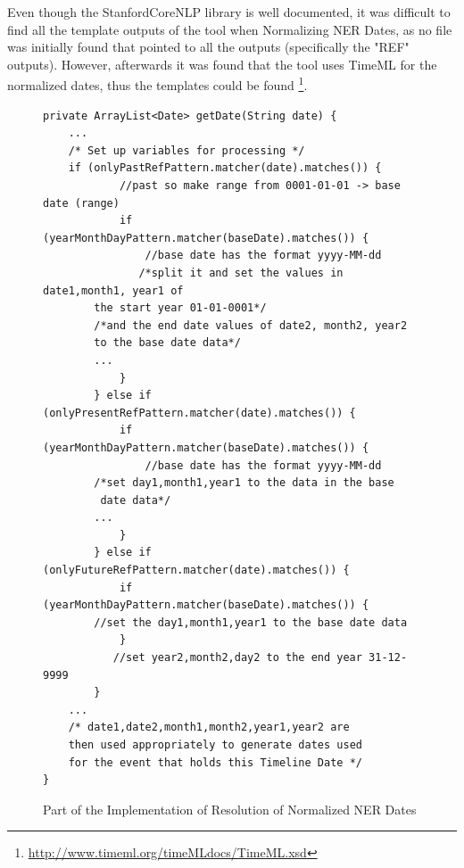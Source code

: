\par Even though the StanfordCoreNLP library is well documented, it was difficult to find all the template outputs of the tool when Normalizing NER Dates, as no file was initially found that pointed to all the outputs (specifically the "REF" outputs). However, afterwards it was found that the tool uses TimeML for the normalized dates, thus the templates could be found \footnote{\url{http://www.timeml.org/timeMLdocs/TimeML.xsd}}. 
\begin{figure}[H]
\begin{lstlisting}
private ArrayList<Date> getDate(String date) {
	...
	/* Set up variables for processing */
	if (onlyPastRefPattern.matcher(date).matches()) {
            //past so make range from 0001-01-01 -> base date (range)
            if (yearMonthDayPattern.matcher(baseDate).matches()) {
                //base date has the format yyyy-MM-dd
               /*split it and set the values in date1,month1, year1 of 
		the start year 01-01-0001*/
		/*and the end date values of date2, month2, year2 
		to the base date data*/
		...
            }
        } else if (onlyPresentRefPattern.matcher(date).matches()) {
            if (yearMonthDayPattern.matcher(baseDate).matches()) {
                //base date has the format yyyy-MM-dd
		/*set day1,month1,year1 to the data in the base
		 date data*/
		...
            }
        } else if (onlyFutureRefPattern.matcher(date).matches()) {
            if (yearMonthDayPattern.matcher(baseDate).matches()) {
		//set the day1,month1,year1 to the base date data
            }
           //set year2,month2,day2 to the end year 31-12-9999
        }
	...
	/* date1,date2,month1,month2,year1,year2 are 
	then used appropriately to generate dates used 
	for the event that holds this Timeline Date */
}
\end{lstlisting}
\caption{Part of the Implementation of Resolution of Normalized NER Dates}
\label{fig:refCode}
\end{figure}
